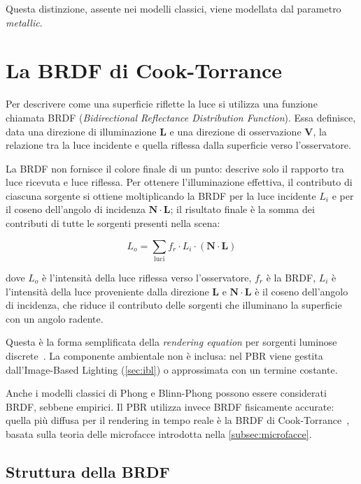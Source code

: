 \documentclass[12pt,a4paper,twoside]{book}
\begin{document}
Questa distinzione, assente nei modelli classici, viene modellata dal parametro \textit{metallic}.

\section{La BRDF di Cook-Torrance}
\label{sec:cook-torrance}

Per descrivere come una superficie riflette la luce si utilizza una funzione chiamata BRDF (\textit{Bidirectional Reflectance Distribution Function}). Essa definisce, data una direzione di illuminazione $\mathbf{L}$ e una direzione di osservazione $\mathbf{V}$, la relazione tra la luce incidente e quella riflessa dalla superficie verso l'osservatore.

La BRDF non fornisce il colore finale di un punto: descrive solo il rapporto tra luce ricevuta e luce riflessa. Per ottenere l'illuminazione effettiva, il contributo di ciascuna sorgente si ottiene moltiplicando la BRDF per la luce incidente $L_i$ e per il coseno dell'angolo di incidenza $\mathbf{N} \cdot \mathbf{L}$; il risultato finale è la somma dei contributi di tutte le sorgenti presenti nella scena:

\begin{equation}
    L_o = \sum_{\text{luci}} f_r \cdot L_i \cdot (\mathbf{N} \cdot \mathbf{L})
    \label{eq:rendering-eq}
\end{equation}

dove $L_o$ è l'intensità della luce riflessa verso l'osservatore, $f_r$ è la BRDF, $L_i$ è l'intensità della luce proveniente dalla direzione $\mathbf{L}$ e $\mathbf{N} \cdot \mathbf{L}$ è il coseno dell'angolo di incidenza, che riduce il contributo delle sorgenti che illuminano la superficie con un angolo radente.

Questa è la forma semplificata della \textit{rendering equation} per sorgenti luminose discrete~\cite{kajiya1986}. La componente ambientale non è inclusa: nel PBR viene gestita dall'Image-Based Lighting (\cref{sec:ibl}) o approssimata con un termine costante.

Anche i modelli classici di Phong e Blinn-Phong possono essere considerati BRDF, sebbene empirici. Il PBR utilizza invece BRDF fisicamente accurate: quella più diffusa per il rendering in tempo reale è la BRDF di Cook-Torrance~\cite{cook1982}, basata sulla teoria delle microfacce introdotta nella \cref{subsec:microfacce}.

\subsection{Struttura della BRDF}
\label{subsec:struttura-brdf}
\end{document}
